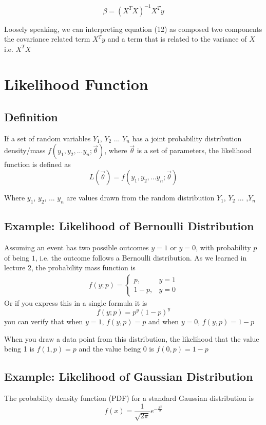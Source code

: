 \documentclass[12pt, oneside]{article}
\begin{document}
\begin{equation}
\beta=({X^T}{X})^{-1}{X^{T}}{y}
\end{equation}

Loosely speaking, we can interpreting equation (12) as composed two components the covariance related term $X^{T}y$ and a term that is related to the variance of $X$ i.e. ${X^T}{X}$


\section{Likelihood Function}
\subsection{Definition}
If a set of random variables $Y_1$, $Y_2$ ... $Y_n$ has a joint probability distribution density/mass $f(y_1, y_2, ...y_n;\vec{\theta})$, where $\vec{\theta}$ is a set of parameters, the likelihood function is defined as 
\begin{equation}
L(\vec{\theta})=f(y_1, y_2, ...y_n; \vec{\theta})
\end{equation}

Where $y_1$, $y_2$, ... $y_n$ are values drawn from the random distribution $Y_1$, $Y_2$ ... ,$Y_n$ 

\subsection{Example: Likelihood of Bernoulli Distribution}
Assuming an event has two possible outcomes $y=1$ or $y=0$, with probability $p$ of being $1$, i.e. the outcome follows a Bernoulli distribution. As we learned in lecture 2, the probability mass function is 
\begin{align*}
f(y; p)=
\begin{cases}
p, &y=1\\
1-p,  &y=0
\end{cases}
\end{align*}
Or if you express this in a single formula it is 
$$f(y;p)=p^y(1-p)^y$$
you can verify that when $y=1$, $f(y, p)=p$ and when $y=0$, $f(y, p)=1-p$

When you draw a data point from this distribution, the likelihood that the value being 1 is $f(1, p)=p$ and the value being 0 is $f(0, p)=1-p$

\subsection{Example: Likelihood of Gaussian Distribution}
The probability density function (PDF) for a standard Gaussian distribution is 
$$f(x)=\frac{1}{\sqrt{2\pi}}e^{-\frac{x^2}{2}}$$
\end{document}
